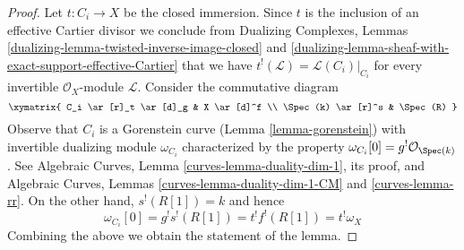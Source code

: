 \begin{proof}
Let $t : C_i \to X$ be the closed immersion. Since $t$ is
the inclusion of an effective Cartier divisor we conclude from
Dualizing Complexes, Lemmas
\ref{dualizing-lemma-twisted-inverse-image-closed} and
\ref{dualizing-lemma-sheaf-with-exact-support-effective-Cartier}
that we have $t^!(\mathcal{L}) = \mathcal{L}(C_i)|_{C_i}$
for every invertible $\mathcal{O}_X$-module $\mathcal{L}$.
Consider the commutative diagram
$$
\xymatrix{
C_i \ar[r]_t \ar[d]_g & X \ar[d]^f \\
\Spec(k) \ar[r]^s & \Spec(R)
}
$$
Observe that $C_i$ is a Gorenstein curve
(Lemma \ref{lemma-gorenstein}) with invertible
dualizing module $\omega_{C_i}$ characterized by the property
$\omega_{C_i}[0] = g^!\mathcal{O}_{\Spec(k)}$. See
Algebraic Curves, Lemma \ref{curves-lemma-duality-dim-1}, its proof, and
Algebraic Curves, Lemmas \ref{curves-lemma-duality-dim-1-CM} and
\ref{curves-lemma-rr}.
On the other hand, $s^!(R[1]) = k$ and hence
$$
\omega_{C_i}[0] =
g^! s^!(R[1]) = t^!f^!(R[1]) = t^!\omega_X
$$
Combining the above we obtain the statement of the lemma.
\end{proof}











